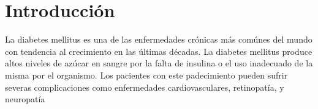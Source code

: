 \chapter*{Introducción}\label{chapter:introduction}

La diabetes mellitus es una de las enfermedades crónicas más comúnes del mundo con tendencia al crecimiento en las últimas décadas. La diabetes mellitus produce altos niveles de azúcar en sangre por la falta de insulina o el uso inadecuado de la misma por el organismo. Los pacientes con este padecimiento pueden sufrir severas complicaciones como enfermedades cardiovasculares, retinopatía, y neuropatía